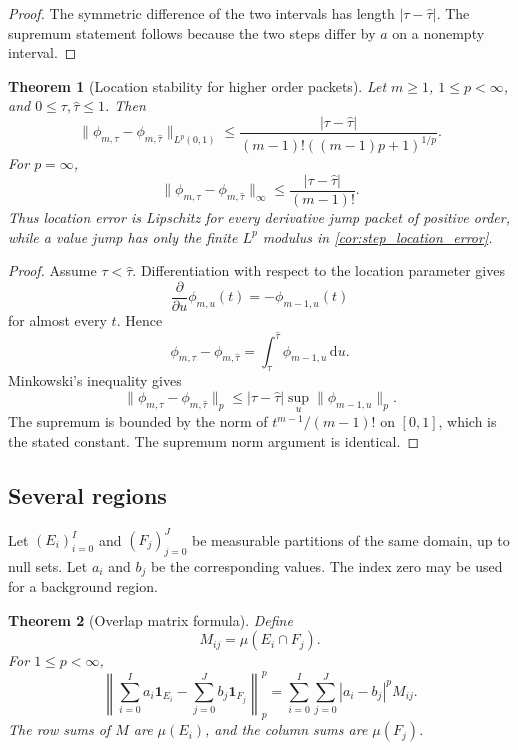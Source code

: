 \documentclass[11pt,a4paper]{article}
\newtheorem{theorem}{Theorem}[section]
\theoremstyle{definition}
\theoremstyle{remark}
\newcommand{\one}{\mathbf 1}
\newcommand{\dd}{\,\mathrm d}
\begin{document}
\begin{proof}
The symmetric difference of the two intervals has length \(|\tau-\widehat\tau|\). The supremum statement follows because the two steps differ by \(a\) on a nonempty interval.
\end{proof}

\begin{theorem}[Location stability for higher order packets]\label{thm:higher_order_location}
Let \(m\geq1\), \(1\leq p<\infty\), and \(0\leq\tau,\widehat\tau\leq1\). Then
\[
\|\phi_{m,\tau}-\phi_{m,\widehat\tau}\|_{L^p(0,1)}
\leq
\frac{|\tau-\widehat\tau|}
{(m-1)!((m-1)p+1)^{1/p}}.
\]
For \(p=\infty\),
\[
\|\phi_{m,\tau}-\phi_{m,\widehat\tau}\|_\infty
\leq
\frac{|\tau-\widehat\tau|}{(m-1)!}.
\]
Thus location error is Lipschitz for every derivative jump packet of positive order, while a value jump has only the finite \(L^p\) modulus in \cref{cor:step_location_error}.
\end{theorem}

\begin{proof}
Assume \(\tau<\widehat\tau\). Differentiation with respect to the location parameter gives
\[
\frac{\partial}{\partial u}\phi_{m,u}(t)
=-\phi_{m-1,u}(t)
\]
for almost every \(t\). Hence
\[
\phi_{m,\tau}-\phi_{m,\widehat\tau}
=
\int_\tau^{\widehat\tau}\phi_{m-1,u}\dd u.
\]
Minkowski's inequality gives
\[
\|\phi_{m,\tau}-\phi_{m,\widehat\tau}\|_p
\leq
|\tau-\widehat\tau|
\sup_u\|\phi_{m-1,u}\|_p.
\]
The supremum is bounded by the norm of \(t^{m-1}/(m-1)!\) on \([0,1]\), which is the stated constant. The supremum norm argument is identical.
\end{proof}

\subsection{Several regions}

Let \((E_i)_{i=0}^{I}\) and \((F_j)_{j=0}^{J}\) be measurable partitions of the same domain, up to null sets. Let \(a_i\) and \(b_j\) be the corresponding values. The index zero may be used for a background region.

\begin{theorem}[Overlap matrix formula]\label{thm:overlap_matrix}
Define
\[
M_{ij}=\mu(E_i\cap F_j).
\]
For \(1\leq p<\infty\),
\[
\left\|
\sum_{i=0}^{I}a_i\one_{E_i}
-
\sum_{j=0}^{J}b_j\one_{F_j}
\right\|_p^p
=
\sum_{i=0}^{I}\sum_{j=0}^{J}|a_i-b_j|^pM_{ij}.
\]
The row sums of \(M\) are \(\mu(E_i)\), and the column sums are \(\mu(F_j)\).
\end{theorem}
\end{document}
